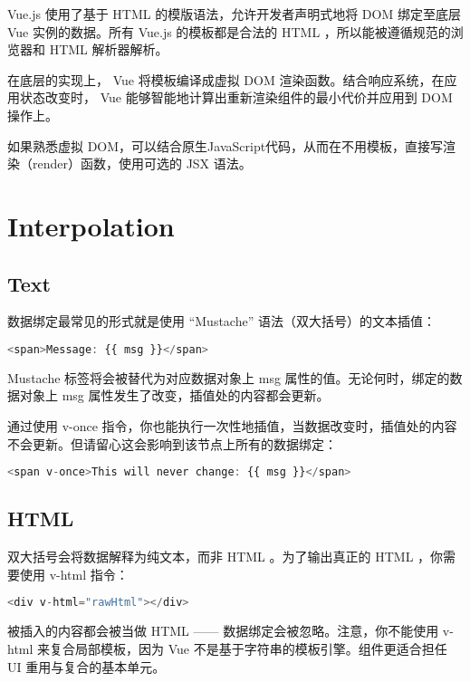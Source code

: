 Vue.js 使用了基于 HTML 的模版语法，允许开发者声明式地将 DOM 绑定至底层 Vue 实例的数据。所有 Vue.js 的模板都是合法的 HTML ，所以能被遵循规范的浏览器和 HTML 解析器解析。


在底层的实现上， Vue 将模板编译成虚拟 DOM 渲染函数。结合响应系统，在应用状态改变时， Vue 能够智能地计算出重新渲染组件的最小代价并应用到 DOM 操作上。

如果熟悉虚拟 DOM，可以结合原生JavaScript代码，从而在不用模板，直接写渲染（render）函数，使用可选的 JSX 语法。

\section{Interpolation}


\subsection{Text}

数据绑定最常见的形式就是使用 “Mustache” 语法（双大括号）的文本插值：

\begin{lstlisting}[language=JavaScript]
<span>Message: {{ msg }}</span>
\end{lstlisting}

Mustache 标签将会被替代为对应数据对象上 msg 属性的值。无论何时，绑定的数据对象上 msg 属性发生了改变，插值处的内容都会更新。




通过使用 v-once 指令，你也能执行一次性地插值，当数据改变时，插值处的内容不会更新。但请留心这会影响到该节点上所有的数据绑定：

\begin{lstlisting}[language=JavaScript]
<span v-once>This will never change: {{ msg }}</span>
\end{lstlisting}




\subsection{HTML}

双大括号会将数据解释为纯文本，而非 HTML 。为了输出真正的 HTML ，你需要使用 v-html 指令：

\begin{lstlisting}[language=JavaScript]
<div v-html="rawHtml"></div>
\end{lstlisting}

被插入的内容都会被当做 HTML —— 数据绑定会被忽略。注意，你不能使用 v-html 来复合局部模板，因为 Vue 不是基于字符串的模板引擎。组件更适合担任 UI 重用与复合的基本单元。

